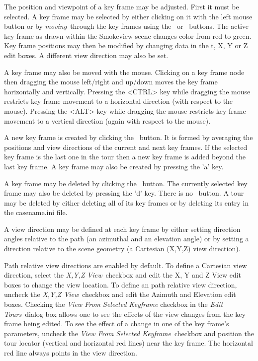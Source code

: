 \documentclass[11pt,twoside]{book}
\newcommand{\frameit}[1]{\fbox{\tt #1}}
\begin{document}
The position and viewpoint of a key frame may be adjusted.  First
it must be selected.  A key frame may be selected by either
clicking on it with the left mouse button or by {\em moving}\ through
the key frames using the \frameit{Next}\ or \frameit{Previous}\
buttons. The active key frame as drawn within the Smokeview scene changes color from red to green.
Key frame positions may then be modified by changing
data in the t, X, Y or Z edit boxes. A different view direction
may also be set.

A key frame may also be moved with the mouse.  Clicking on a
key frame node then dragging the mouse left/right and up/down
moves the key frame horizontally and vertically.  Pressing the
<CTRL> key while dragging the mouse
restricts key frame movement to a horizontal direction (with respect to the mouse).
Pressing the <ALT> key while dragging the mouse
restricts key frame movement to a vertical direction (again with respect to the mouse).

A new key frame is created by clicking the \frameit{Add}\ button.
It is formed by averaging the positions and view directions of the
current and next key frames. If the selected key frame is the last
one in the tour then a new key frame  is added beyond the last
key frame.  A key frame may also be created by pressing the 'a' key.

A key frame may be deleted by clicking the \frameit{Delete}\
button. The currently selected key frame may also be deleted by pressing the 'd' key.
There is no \frameit{Delete Tour}\ button. A tour may be
deleted by either deleting all of its key frames or by deleting its
entry in the casename.ini file.

A view direction may be defined at each key frame by either setting
direction angles relative to the path (an azimuthal and an elevation
angle) or by setting a direction relative to the scene geometry (a
Cartesian (X,Y,Z) view direction).

Path relative view directions are enabled by default.  To define a
Cartesian view direction, select the {\em X,Y,Z View}\ checkbox
and edit the X, Y and Z View edit boxes to change the view
location. To define an path relative view direction, uncheck the
{\em X,Y,Z View}\ checkbox and edit the Azimuth and Elevation edit
boxes. Checking the {\em View From Selected Keyframe} checkbox in
the {\em Edit Tours}\ dialog box allows one to see the effects of
the  view changes from the key frame being edited. To see the
effect of a change in one of the key frame's parameters, uncheck
the {\em View From Selected Keyframe}\ checkbox and position the
tour locator (vertical and horizontal red lines) near the
key frame.  The horizontal red line always points in the view
direction.
\end{document}
